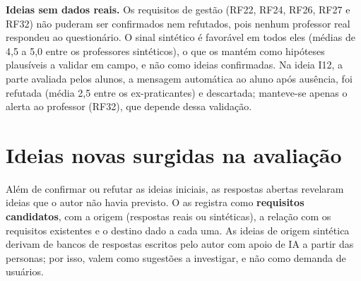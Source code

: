 \textbf{Ideias sem dados reais.} Os requisitos de gestão (RF22, RF24,
RF26, RF27 e RF32) não puderam ser confirmados nem refutados, pois nenhum
professor real respondeu ao questionário. O sinal sintético é favorável
em todos eles (médias de 4,5 a 5,0 entre os professores sintéticos), o
que os mantém como hipóteses plausíveis a validar em campo, e não como
ideias confirmadas. Na ideia I12, a parte avaliada pelos alunos, a
mensagem automática ao aluno após ausência, foi refutada (média 2,5
entre os ex-praticantes) e descartada; manteve-se apenas o alerta ao
professor (RF32), que depende dessa validação.

\section{Ideias novas surgidas na avaliação}
\label{sec:ideias-novas}

Além de confirmar ou refutar as ideias iniciais, as respostas abertas
revelaram ideias que o autor não havia previsto. O
 as registra como \textbf{requisitos
candidatos}, com a origem (respostas reais ou sintéticas), a relação com
os requisitos existentes e o destino dado a cada uma. As ideias de origem
sintética derivam de bancos de respostas escritos pelo autor com apoio de
IA a partir das personas; por isso, valem como sugestões a investigar, e
não como demanda de usuários.

